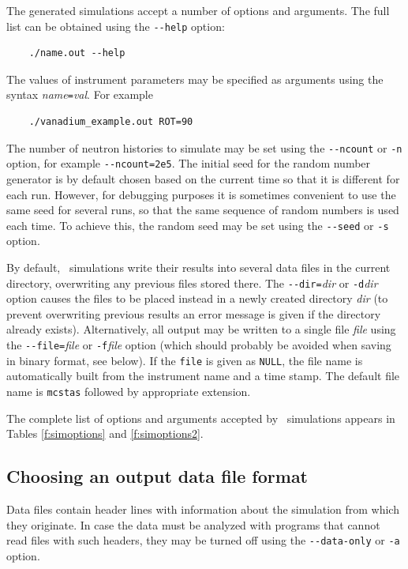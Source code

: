 The generated simulations accept a number of options and arguments. The
full list can be obtained using the \verb+--help+ option:
\begin{verbatim}
    ./name.out --help
\end{verbatim}
The values of instrument parameters may be specified as arguments using
the syntax \textit{name}\verb+=+\textit{val}. For example
\begin{verbatim}
    ./vanadium_example.out ROT=90
\end{verbatim}
The number of neutron histories to simulate may be set using the
\verb+--ncount+ or \verb+-n+ option, for example
\verb+--ncount=2e5+. The initial seed for the random number generator is
by default chosen based on the current time so that it is different for
each run. However, for debugging purposes it is sometimes convenient to
use the same seed for several runs, so that the same sequence of random
numbers is used each time. To achieve this, the random seed may be set
using the \verb+--seed+ or \verb+-s+ option.

By default, \MCS\ simulations write their results into several data files in the
current directory, overwriting any previous files stored there. The
\verb+--dir=+\textit{dir} or \verb+-d+\textit{dir} option causes the files to be
placed instead in a newly created directory \textit{dir} (to prevent overwriting
previous results an error message is given if the directory already exists).
Alternatively, all output may be written to a single file \textit{file} using
the \verb+--file=+\textit{file} or \verb+-f+\textit{file} option (which should
probably be avoided when saving in binary format, see below). If the \verb+file+ is given as \verb+NULL+, the file name is automatically built from the instrument name and a time stamp. The default file name is \verb+mcstas+ followed by appropriate extension.

The complete list of options
and arguments accepted by \MCS\ simulations appears in
Tables \ref{f:simoptions} and \ref{f:simoptions2}.

\subsection{Choosing an output data file format}

Data files contain header lines with information about the
simulation from which they originate. In case the data must be analyzed
with programs that cannot read files with such headers, they may be
turned off using the \verb+--data-only+ or \verb+-a+ option.

